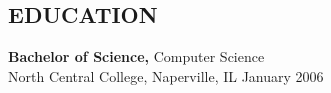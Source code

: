 \documentclass[line,margin]{res}
\begin{document}
\begin{resume}
\section{EDUCATION} {\bf Bachelor of Science,} Computer Science \\
                North Central College, Naperville, IL 
                January 2006
\end{resume}
\end{document}
